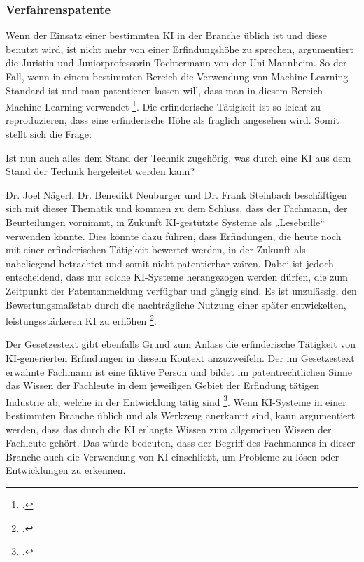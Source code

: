 \subsubsection{Verfahrenspatente}

Wenn der Einsatz einer bestimmten KI in der Branche üblich ist 
und diese benutzt wird,
ist nicht mehr von einer Erfindungshöhe zu sprechen, argumentiert
die Juristin und Juniorprofessorin Tochtermann von der Uni Mannheim.
So der Fall, wenn in einem bestimmten Bereich die Verwendung von
Machine Learning Standard ist und man patentieren lassen will,
dass man in diesem Bereich Machine Learning verwendet \footcite{WieManPatente2021}.
Die erfinderische Tätigkeit ist so leicht zu reproduzieren,
dass eine erfinderische Höhe als fraglich angesehen wird.
Somit stellt sich die Frage: 

Ist nun auch alles dem Stand der Technik zugehörig, was durch eine KI aus dem 
Stand der Technik hergeleitet werden kann? 

Dr. Joel Nägerl, Dr. Benedikt Neuburger und Dr. Frank Steinbach beschäftigen
sich mit dieser Thematik und kommen zu dem Schluss,
dass der Fachmann, der Beurteilungen vornimmt, 
in Zukunft KI-gestützte Systeme als „Lesebrille“ verwenden könnte.
Dies könnte dazu führen, dass Erfindungen, 
die heute noch mit einer erfinderischen Tätigkeit bewertet werden, 
in der Zukunft als naheliegend betrachtet und somit nicht patentierbar wären.
Dabei ist jedoch entscheidend, 
dass nur solche KI-Systeme herangezogen werden dürfen, 
die zum Zeitpunkt der Patentanmeldung verfügbar und gängig sind. 
Es ist unzulässig, den Bewertungsmaßstab durch die nachträgliche Nutzung 
einer später entwickelten, leistungsstärkeren KI zu erhöhen 
\footcite{nagerlKunstlicheIntelligenzParadigmenwechsel2019}.

Der Gesetzestext gibt ebenfalls Grund zum Anlass die erfinderische 
Tätigkeit von KI-generierten Erfindungen in diesem Kontext anzuzweifeln.
Der im Gesetzestext erwähnte Fachmann ist eine fiktive Person
und bildet im patentrechtlichen Sinne das Wissen der
Fachleute in dem jeweiligen Gebiet der Erfindung tätigen Industrie ab,
welche in der Entwicklung tätig sind \footcite{asendorfPatGErfindungAuf2023}.
Wenn KI-Systeme in einer bestimmten Branche üblich 
und als Werkzeug anerkannt sind, kann argumentiert werden, 
dass das durch die KI erlangte Wissen 
zum allgemeinen Wissen der Fachleute gehört. 
Das würde bedeuten, dass der Begriff des Fachmannes
in dieser Branche auch die Verwendung von KI einschließt, 
um Probleme zu lösen oder Entwicklungen zu erkennen.

